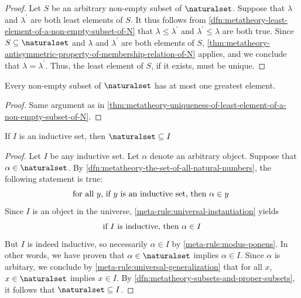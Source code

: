 \begin{proof}
    Let \( S \) be an arbitrary non-empty subset of \( \naturalset \).
    Suppose that \( \lambda \) and \( \lambda^{\prime} \) are both least elements of \( S \).
    It thus follows from \cref{dfn:metatheory-least-element-of-a-non-empty-subset-of-N} that \( \lambda \leq \lambda^{\prime} \)
    and \( \lambda^{\prime} \leq \lambda \) are both true.
    Since \( S \subseteq \naturalset \) and \( \lambda \) and \( \lambda^{\prime} \) are both elements of \( S \), 
    \cref{thm:metatheory-antisymmetric-property-of-membership-relation-of-N} applies, and we conclude that \( \lambda = \lambda^{\prime} \).
    Thus, the least element of \( S \), if it exists, must be unique.
\end{proof}

\begin{thm}
     \label{thm:metatheory-uniqueness-of-greatest-element-of-a-non-empty-subset-of-N}
    Every non-empty subset of \( \naturalset \) has at most one greatest element.
\end{thm}

\begin{proof}
    Same argument as in \cref{thm:metatheory-uniqueness-of-least-element-of-a-non-empty-subset-of-N}.
\end{proof}

\begin{thm}
     \label{thm:metatheory-the-set-of-natural-numbers-is-a-subset-of-any-inductive-set}
    If \( I \) is an inductive set, then \( \naturalset \subseteq I \)
\end{thm}

\begin{proof}
    Let \( I \) be any inductive set.
    Let \( \alpha \) denote an arbitrary object.
    Suppose that \( \alpha \in \naturalset \). By \cref{dfn:metatheory-the-set-of-all-natural-numbers}, the following statement is true:
    \begin{equation*}
        \text{for all \( y \), if \( y \) is an inductive set, then \( \alpha \in y \) }
    \end{equation*}
    Since \( I \) is an object in the universe, \cref{meta-rule:universal-instantiation} yields
    \begin{equation*}
        \text{if \( I \) is inductive, then \( \alpha \in I \)}
    \end{equation*}
    But \( I \) is indeed inductive, so necessarily \( \alpha \in I \) by \cref{meta-rule:modus-ponens}.
    In other words, we have proven that \( \alpha \in \naturalset \) implies \( \alpha \in I \).
    Since \( \alpha \) is arbitary, we conclude by \cref{meta-rule:universal-generalization} that
    for all \( x \), \( x \in \naturalset \) implies \( x \in I \).
    By \cref{dfn:metatheory-subsets-and-proper-subsets}, it follows that \( \naturalset \subseteq I \).
\end{proof}

